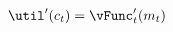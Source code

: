   \begin{equation}\begin{gathered}\begin{aligned}
    \util^{\prime}({c}_{t})  & = \null{\vFunc}^{\prime}_{t}({m}_{t})\label{eq:Envelope}
  \end{aligned}\end{gathered}\end{equation}
